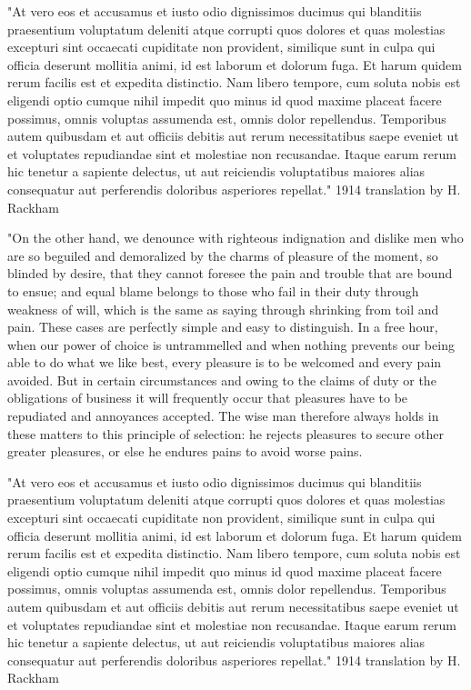 "At vero eos et accusamus et iusto odio dignissimos ducimus qui blanditiis praesentium voluptatum deleniti atque corrupti quos dolores et quas molestias excepturi sint occaecati cupiditate non provident, similique sunt in culpa qui officia deserunt mollitia animi, id est laborum et dolorum fuga. Et harum quidem rerum facilis est et expedita distinctio. Nam libero tempore, cum soluta nobis est eligendi optio cumque nihil impedit quo minus id quod maxime placeat facere possimus, omnis voluptas assumenda est, omnis dolor repellendus. Temporibus autem quibusdam et aut officiis debitis aut rerum necessitatibus saepe eveniet ut et voluptates repudiandae sint et molestiae non recusandae. Itaque earum rerum hic tenetur a sapiente delectus, ut aut reiciendis voluptatibus maiores alias consequatur aut perferendis doloribus asperiores repellat."
1914 translation by H. Rackham

"On the other hand, we denounce with righteous indignation and dislike men who are so beguiled and demoralized by the charms of pleasure of the moment, so blinded by desire, that they cannot foresee the pain and trouble that are bound to ensue; and equal blame belongs to those who fail in their duty through weakness of will, which is the same as saying through shrinking from toil and pain. These cases are perfectly simple and easy to distinguish. In a free hour, when our power of choice is untrammelled and when nothing prevents our being able to do what we like best, every pleasure is to be welcomed and every pain avoided. But in certain circumstances and owing to the claims of duty or the obligations of business it will frequently occur that pleasures have to be repudiated and annoyances accepted. The wise man therefore always holds in these matters to this principle of selection: he rejects pleasures to secure other greater pleasures, or else he endures pains to avoid worse pains.

"At vero eos et accusamus et iusto odio dignissimos ducimus qui blanditiis praesentium voluptatum deleniti atque corrupti quos dolores et quas molestias excepturi sint occaecati cupiditate non provident, similique sunt in culpa qui officia deserunt mollitia animi, id est laborum et dolorum fuga. Et harum quidem rerum facilis est et expedita distinctio. Nam libero tempore, cum soluta nobis est eligendi optio cumque nihil impedit quo minus id quod maxime placeat facere possimus, omnis voluptas assumenda est, omnis dolor repellendus. Temporibus autem quibusdam et aut officiis debitis aut rerum necessitatibus saepe eveniet ut et voluptates repudiandae sint et molestiae non recusandae. Itaque earum rerum hic tenetur a sapiente delectus, ut aut reiciendis voluptatibus maiores alias consequatur aut perferendis doloribus asperiores repellat."
1914 translation by H. Rackham

